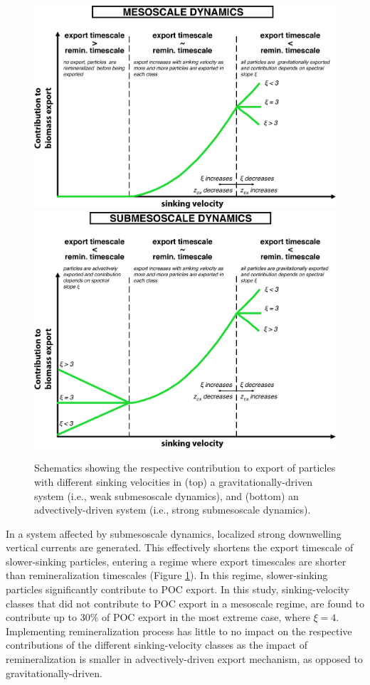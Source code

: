 \documentclass[draft,linenumbers]{agujournal2018}
\begin{document}
 \begin{figure}[ht!]
	\centering
	\includegraphics[width = .65\linewidth]{figures/cartoon_meso}\\[.2cm]
	\includegraphics[width = .65\linewidth]{figures/cartoon_submeso}
	\caption{Schematics showing the respective contribution to export of particles with different sinking velocities in (top) a gravitationally-driven system (i.e., weak submesoscale dynamics), and (bottom) an advectively-driven system (i.e., strong submesoscale dynamics).}
	\label{fig: export_cartoon}
\end{figure}

In a system affected by submesoscale dynamics, localized strong downwelling vertical currents are generated. This effectively shortens the export timescale of slower-sinking particles, entering a regime where export timescales are shorter than remineralization timescales (Figure \ref{fig: export_cartoon}). In this regime, slower-sinking particles significantly contribute to POC export. In this study, sinking-velocity classes that did not contribute to POC export in a mesoscale regime, are found to contribute up to 30\% of POC export in the most extreme case, where $\xi =4$. Implementing remineralization process has little to no impact on the respective contributions of the different sinking-velocity classes as the impact of remineralization is smaller in advectively-driven export mechanism, as opposed to gravitationally-driven.
\end{document}
